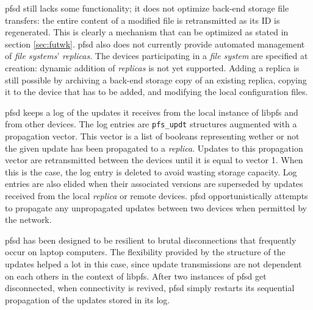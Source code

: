 pfsd still lacks some functionality; it does not optimize back-end
storage file transfers: the entire content of a modified file is
retransmitted as its ID is regenerated. This is clearly a mechanism
that can be optimized as stated in section \ref{sec:futwk}. pfsd
also does not currently provide automated management of \emph{file
  systems}' \emph{replicas}. The devices participating in a \emph{file
  system} are specified at creation: dynamic addition of
\emph{replicas} is not yet supported. Adding a replica is still
possible by archiving a back-end storage copy of an existing replica,
copying it to the device that has to be added, and modifying the local
configuration files.

pfsd keeps a log of the updates it receives from the local instance of
libpfs and from other devices. The log entries are {\tt pfs\_updt}
structures augmented with a propagation vector. This vector is a list
of booleans representing wether or not the given update has been
propagated to a \emph{replica}. Updates to this propagation vector are
retransmitted between the devices until it is equal to vector 1.  When
this is the case, the log entry is deleted to avoid wasting storage
capacity. Log entries are also elided when their associated versions
are superseded by updates received from the local \emph{replica} or
remote devices. pfsd opportunistically attempts to propagate any
unpropagated updates between two devices when permitted by the
network.

pfsd has been designed to be resilient to brutal disconnections that
frequently occur on laptop computers. The flexibility provided by the
structure of the updates helped a lot in this case, since update
transmissions are not dependent on each others in the context of
libpfs. After two instances of pfsd get disconnected, when
connectivity is revived, pfsd simply restarts its sequential
propagation of the updates stored in its log.

